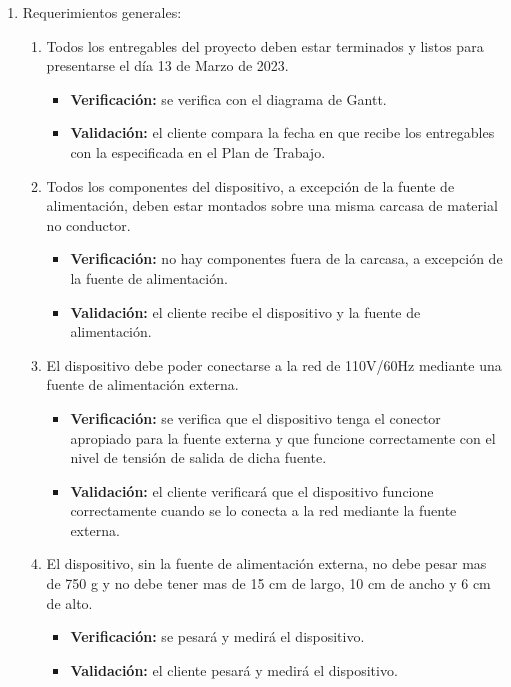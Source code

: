 \documentclass[
11pt, %
codirector, %
]{charter}
\begin{document}
\begin{enumerate}

\item Requerimientos generales:
\begin{enumerate}
\item Todos los entregables del proyecto deben estar terminados y listos para presentarse el día 13 de Marzo de 2023.
\begin{itemize}
	\item \textbf{Verificación:} se verifica con el diagrama de Gantt.
	\item \textbf{Validación:} el cliente compara la fecha en que recibe los entregables con la especificada en el Plan de Trabajo.
\end{itemize}

\item Todos los componentes del dispositivo, a excepción de la fuente de alimentación, deben estar montados sobre una misma carcasa de material no conductor.
\begin{itemize}
	\item \textbf{Verificación:} no hay componentes fuera de la carcasa, a excepción de la fuente de alimentación.
	\item \textbf{Validación:} el cliente recibe el dispositivo y la fuente de alimentación.
\end{itemize}

\item El dispositivo debe poder conectarse a la red de 110V/60Hz mediante una fuente de alimentación externa.
\begin{itemize}
	\item \textbf{Verificación:} se verifica que el dispositivo tenga el conector apropiado para la fuente externa y que funcione correctamente con el nivel de tensión de salida de dicha fuente.
	\item \textbf{Validación:} el cliente verificará que el dispositivo funcione correctamente cuando se lo conecta a la red mediante la fuente externa.
\end{itemize}

\item El dispositivo, sin la fuente de alimentación externa, no debe pesar mas de 750 g y no debe tener mas de 15 cm de largo, 10 cm de ancho y 6 cm de alto.
\begin{itemize}
	\item \textbf{Verificación:} se pesará y medirá el dispositivo.
	\item \textbf{Validación:} el cliente pesará y medirá el dispositivo.
\end{itemize}


\end{enumerate}
\end{enumerate}
\end{document}
